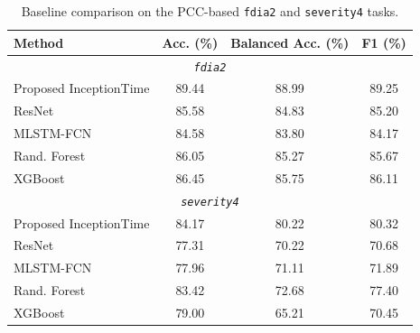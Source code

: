 \documentclass[lettersize,journal]{IEEEtran}
\begin{document}
\begin{table}[t]
\centering
\caption{Baseline comparison on the PCC-based \texttt{fdia2} and \texttt{severity4} tasks.}
\label{tab:model_comparison_hard_tasks}
\renewcommand{\arraystretch}{1.05}
\setlength{\tabcolsep}{3pt}
\begin{tabular}{l c c c}
\hline
Method & Acc. (\%) & Balanced Acc. (\%) & F1 (\%) \\
\hline
\multicolumn{4}{c}{\textit{\texttt{fdia2}}} \\
\hline
Proposed InceptionTime & 89.44 & 88.99 & 89.25 \\
ResNet        & 85.58 & 84.83 & 85.20 \\
MLSTM-FCN     & 84.58 & 83.80 & 84.17 \\
Rand. Forest  & 86.05 & 85.27 & 85.67 \\
XGBoost       & 86.45 & 85.75 & 86.11 \\
\hline
\multicolumn{4}{c}{\textit{\texttt{severity4}}} \\
\hline
Proposed InceptionTime & 84.17 & 80.22 & 80.32 \\
ResNet        & 77.31 & 70.22 & 70.68 \\
MLSTM-FCN     & 77.96 & 71.11 & 71.89 \\
Rand. Forest  & 83.42 & 72.68 & 77.40 \\
XGBoost       & 79.00 & 65.21 & 70.45 \\
\hline
\end{tabular}
\end{table}
\end{document}
